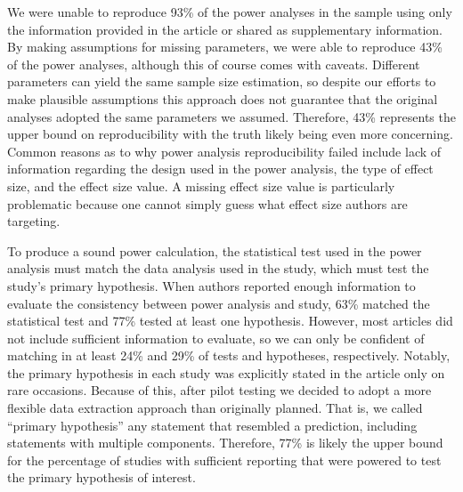 \documentclass[
  doc, donotrepeattitle,floatsintext]{apa7}
\begin{document}
We were unable to reproduce 93\% of the power analyses in the sample using only the information provided in the article or shared as supplementary information. By making assumptions for missing parameters, we were able to reproduce 43\% of the power analyses, although this of course comes with caveats. Different parameters can yield the same sample size estimation, so despite our efforts to make plausible assumptions this approach does not guarantee that the original analyses adopted the same parameters we assumed. Therefore, 43\% represents the upper bound on reproducibility with the truth likely being even more concerning. Common reasons as to why power analysis reproducibility failed include lack of information regarding the design used in the power analysis, the type of effect size, and the effect size value. A missing effect size value is particularly problematic because one cannot simply guess what effect size authors are targeting.

To produce a sound power calculation, the statistical test used in the power analysis must match the data analysis used in the study, which must test the study's primary hypothesis. When authors reported enough information to evaluate the consistency between power analysis and study, 63\% matched the statistical test and 77\% tested at least one hypothesis. However, most articles did not include sufficient information to evaluate, so we can only be confident of matching in at least 24\% and 29\% of tests and hypotheses, respectively. Notably, the primary hypothesis in each study was explicitly stated in the article only on rare occasions. Because of this, after pilot testing we decided to adopt a more flexible data extraction approach than originally planned. That is, we called ``primary hypothesis'' any statement that resembled a prediction, including statements with multiple components. Therefore, 77\% is likely the upper bound for the percentage of studies with sufficient reporting that were powered to test the primary hypothesis of interest.
\end{document}
